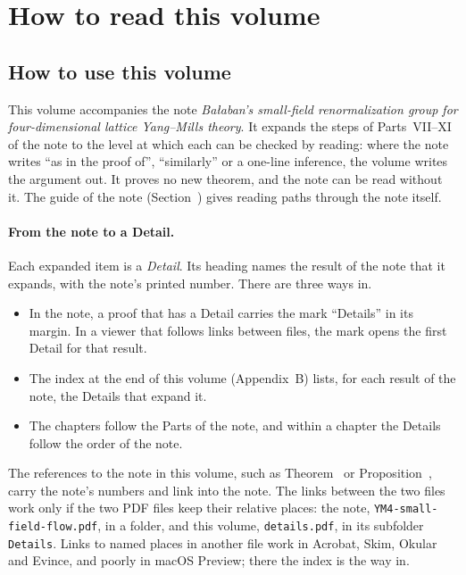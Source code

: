 \section{How to read this volume}\label{sec:guide}

\subsection{How to use this volume}\label{subsec:guide-purpose}

This volume accompanies the note \emph{Ba\l aban's small-field renormalization group for four-dimensional lattice Yang--Mills theory}. It expands the steps of Parts~VII--XI of the note to the level at which each can be checked by reading: where the note writes ``as in the proof of'', ``similarly'' or a one-line inference, the volume writes the argument out. It proves no new theorem, and the note can be read without it. The guide of the note (Section~) gives reading paths through the note itself.

\paragraph{From the note to a Detail.} Each expanded item is a \emph{Detail}. Its heading names the result of the note that it expands, with the note's printed number. There are three ways in.
\begin{itemize}
\item In the note, a proof that has a Detail carries the mark ``Details'' in its margin. In a viewer that follows links between files, the mark opens the first Detail for that result.
\item The index at the end of this volume (Appendix~B) lists, for each result of the note, the Details that expand it.
\item The chapters follow the Parts of the note, and within a chapter the Details follow the order of the note.
\end{itemize}
The references to the note in this volume, such as Theorem~ or Proposition~, carry the note's numbers and link into the note. The links between the two files work only if the two PDF files keep their relative places: the note, \texttt{YM4-small-field-flow.pdf}, in a folder, and this volume, \texttt{details.pdf}, in its subfolder \texttt{Details}. Links to named places in another file work in Acrobat, Skim, Okular and Evince, and poorly in macOS Preview; there the index is the way in.

